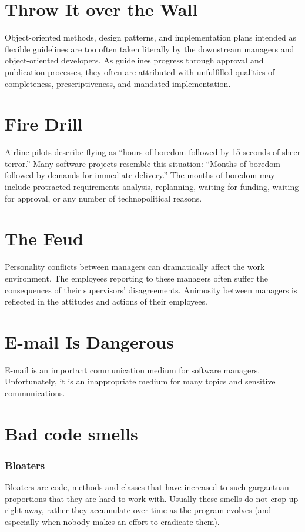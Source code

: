 \documentclass{book}
\newcounter{subpart}
\begin{document}
\chapter{Throw It over the Wall}
Object-oriented methods, design patterns, and implementation plans intended as flexible guidelines are too often taken literally by the downstream managers and object-oriented developers.
As guidelines progress through approval and publication processes, they often are attributed with unfulfilled qualities of completeness, prescriptiveness, and mandated implementation.
\chapter{Fire Drill}
Airline pilots describe flying as “hours of boredom followed by 15 seconds of sheer terror.”
Many software projects resemble this situation: “Months of boredom followed by demands for immediate delivery.”
The months of boredom may include protracted requirements analysis, replanning, waiting for funding, waiting for approval, or any number of technopolitical reasons.
\chapter{The Feud}
Personality conflicts between managers can dramatically affect the work environment.
The employees reporting to these managers often suffer the consequences of their supervisors’ disagreements.
Animosity between managers is reflected in the attitudes and actions of their employees.
\chapter{E-mail Is Dangerous}
E-mail is an important communication medium for software managers. Unfortunately, it is an inappropriate medium for many topics and sensitive communications.

\label{SREF}
\chapter{Bad code smells}
\subsection{Bloaters}
Bloaters are code, methods and classes that have increased to such gargantuan proportions that they are hard to work with.
Usually these smells do not crop up right away, rather they accumulate over time as the program evolves (and especially when nobody makes an effort to eradicate them).
\end{document}
